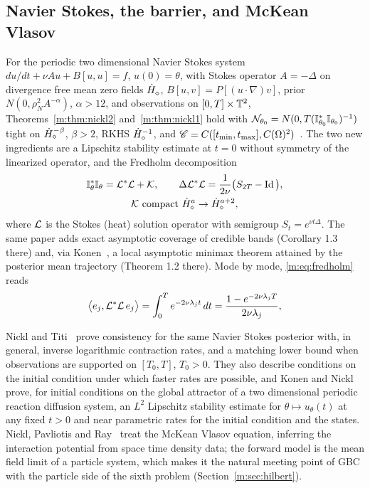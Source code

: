 \subsection{Navier Stokes, the barrier, and McKean Vlasov}

For the periodic two dimensional Navier Stokes system $du/dt+\nu Au+B[u,u]=f$, $u(0)=\theta$, with Stokes operator $A=-\Delta$ on divergence free mean zero fields $\dot H^{}_\diamond$, $B[u,v]=P[(u\cdot\nabla)v]$, prior $N(0,\rho_N^2A^{-\alpha})$, $\alpha>12$, and observations on $[0,T]\times\mathbb{T}^2$, Theorems~\ref{m:thm:nickl2} and~\ref{m:thm:nickl1} hold with $\mathcal{N}_{\theta_0}=N(0,T(\mathbb{I}^*_{\theta_0}\mathbb{I}_{\theta_0})^{-1})$ tight on $\dot H^{-\beta}_\diamond$, $\beta>2$, RKHS $\dot H^{-1}_\diamond$, and $\mathscr{C}=C([t_{\min},t_{\max}],C(\Omega)^2)$~\cite{konennickl2026}. The two new ingredients are a Lipschitz stability estimate at $t=0$ without symmetry of the linearized operator, and the Fredholm decomposition
\begin{equation}\label{m:eq:fredholm}
\begin{gathered}
\mathbb{I}_\theta^*\mathbb{I}_\theta=\mathcal{L}^*\mathcal{L}+\mathcal{K},\qquad \Delta\mathcal{L}^*\mathcal{L}=\frac1{2\nu}\big(S_{2T}-\operatorname{Id}\big),\\
\mathcal{K}\ \text{compact }\dot H^{a}_\diamond\to\dot H^{a+2}_\diamond,
\end{gathered}
\end{equation}
where $\mathcal{L}$ is the Stokes (heat) solution operator with semigroup $S_t=e^{\nu t\Delta}$. The same paper adds exact asymptotic coverage of credible bands (Corollary 1.3 there) and, via Konen~\cite{konen2026}, a local asymptotic minimax theorem attained by the posterior mean trajectory (Theorem 1.2 there). Mode by mode, \eqref{m:eq:fredholm} reads
\begin{equation}\label{m:eq:modeinfo}
\big\langle e_j,\mathcal{L}^*\mathcal{L}\,e_j\big\rangle=\int_0^Te^{-2\nu\lambda_jt}\,dt=\frac{1-e^{-2\nu\lambda_jT}}{2\nu\lambda_j},
\end{equation}

Nickl and Titi~\cite{nickltiti2024} prove consistency for the same Navier Stokes posterior with, in general, inverse logarithmic contraction rates, and a matching lower bound when observations are supported on $[T_0,T]$, $T_0>0$. They also describe conditions on the initial condition under which faster rates are possible, and Konen and Nickl~\cite{konennickl2026attractor} prove, for initial conditions on the global attractor of a two dimensional periodic reaction diffusion system, an $L^2$ Lipschitz stability estimate for $\theta\mapsto u_\theta(t)$ at any fixed $t>0$ and near parametric rates for the initial condition and the states. Nickl, Pavliotis and Ray~\cite{nickl2025} treat the McKean Vlasov equation, inferring the interaction potential from space time density data; the forward model is the mean field limit of a particle system, which makes it the natural meeting point of GBC with the particle side of the sixth problem (Section~\ref{m:sec:hilbert}).

